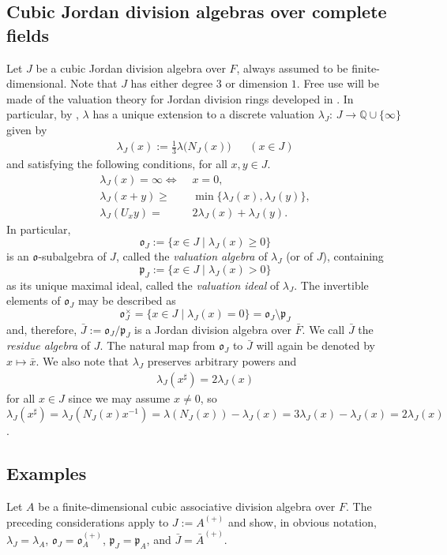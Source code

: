 \documentclass{amsart}
\theoremstyle{definition} %
\theoremstyle{remark} %
\newcommand{\QQ}{\mathbb{Q}}
\newcommand{\IQ}{\QQ}
\newcommand{\mfo}{\mathfrak{o}}
\newcommand{\mfp}{\mathfrak{p}}
\renewcommand{\:}{\colon\,}
\numberwithin{equation}{section}
\begin{document}
\subsection{Cubic Jordan division algebras over complete fields} \label{ss.CUJOCO} Let $J$ be a cubic Jordan division algebra over $F$, always assumed to be finite-dimensional. Note that $J$ has either degree $3$ or dimension $1$. Free use will be made of the valuation theory for Jordan division rings developed in \cite{MR0347922}. In particular, by \cite[Satz~5.1]{MR0347922}, $\lambda$ has a unique extension to a discrete valuation $\lambda_J\:J \to \IQ \cup \{\infty\}$ given by 
\begin{align}
\label{LAMJAY} \lambda_J(x) := \frac{1}{3}\lambda\big(N_J(x)\big) &&(x \in J)
\end{align}
and satisfying the following conditions, for all $x,y \in J$.
\begin{align*}
\lambda_J(x) = \infty \Longleftrightarrow\,\,& x = 0, \\
\lambda_J(x + y)\geq\,\,&\min \{\lambda_J(x),\lambda_J(y)\}, \\
\lambda_J(U_xy) =\,\,&2\lambda_J(x) + \lambda_J(y).
\end{align*}
In particular, 
\[
\mfo_J := \{x \in J \mid \lambda_J(x) \geq 0\}
\]
is an $\mfo$-subalgebra of $J$, called the \emph{valuation algebra} of $\lambda_J$ (or of $J$), containing
\[
\mfp_J := \{x \in J \mid \lambda_J(x) > 0\}
\]
as its unique maximal ideal, called the \emph{valuation ideal} of $\lambda_J$. The invertible elements of $\mfo_J$ may be described as
\[
\mfo_J^\times = \{x \in J\mid \lambda_J(x) = 0\} = \mfo_J \setminus \mfp_J
\]
and, therefore, $\bar J := \mfo_J/\mfp_J$ is a Jordan division algebra over $\bar F$. We call $\bar J$ the \emph{residue algebra} of $J$. The natural map from $\mfo_J$ to $\bar J$ will again be denoted by $x \mapsto \bar x$. We also note that $\lambda_J$ preserves arbitrary powers and 
\begin{align}
\label{LAMSHA} \lambda_J(x^\sharp) = 2\lambda_J(x)
\end{align}
for all $x \in J$ since we may assume $x \ne 0$, so $\lambda_J(x^\sharp) = \lambda_J(N_J(x)x^{-1}) = \lambda(N_J(x)) - \lambda_J(x) = 3\lambda_J(x) - \lambda_J(x)=2\lambda_J(x)$.

\subsection{Examples} \label{ss.CUASDI} Let $A$ be a finite-dimensional cubic associative division algebra over $F$. The preceding considerations apply to $J := A^{(+)}$ and show, in obvious notation, $\lambda_J = \lambda_A$, $\mfo_J= \mfo_A^{(+)}$, $\mfp_J= \mfp_A$, and $\bar J = \bar A^{(+)}$.
\end{document}
